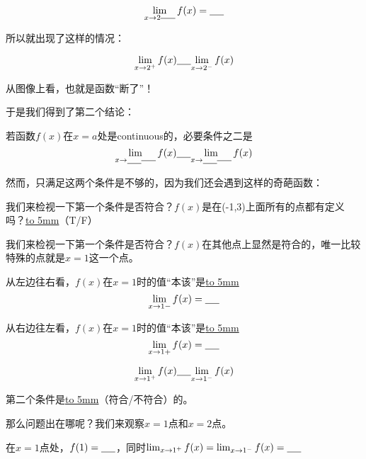 \documentclass[UTF8]{ctexart}
\begin{document}
\[{\lim_{x \to 2^{\underline{\hbox to 5mm{}}}} f(x)} = \underline{\hbox to 5mm{}}\]

所以就出现了这样的情况：

\[{\lim_{x \to 2^+} f(x)} \underline{\hbox to 5mm{}} {\lim_{x \to 2^-} f(x)} \]

从图像上看，也就是函数“断了”！

于是我们得到了第二个结论：

若函数$f(x)$在$x=a$处是continuous的，必要条件之二是\[{\lim_{x \to \underline{\hbox to 5mm{}}^{\underline{\hbox to 5mm{}}}} f(x)}   \underline{\hbox to 5mm{}}    {\lim_{x \to \underline{\hbox to 5mm{}}^{\underline{\hbox to 5mm{}}}} f(x)}\]

然而，只满足这两个条件是不够的，因为我们还会遇到这样的奇葩函数：

\begin{center}
\end{center}

我们来检视一下第一个条件是否符合？$f(x)$是在(-1,3)上面所有的点都有定义吗？\underline{\hbox to 5mm{}}（T/F）

我们来检视一下第一个条件是否符合？$f(x)$在其他点上显然是符合的，唯一比较特殊的点就是$x=1$这一个点。

从左边往右看，$f(x)$在$x=1$时的值“本该”是\underline{\hbox to 5mm{}}
\[{\lim_{x \to 1-} f(x)} = \underline{\hbox to 5mm{}}\]

从右边往左看，$f(x)$在$x=1$时的值“本该”是\underline{\hbox to 5mm{}}
\[{\lim_{x \to 1+} f(x)} = \underline{\hbox to 5mm{}}\]

\[{\lim_{x \to 1^+} f(x)} \underline{\hbox to 5mm{}} {\lim_{x \to 1^-} f(x)} \]

第二个条件是\underline{\hbox to 5mm{}}（符合/不符合）的。

那么问题出在哪呢？我们来观察$x=1$点和$x = 2$点。

在$x = 1$点处，$f(1) = \underline{\hbox to 5mm{}}$，同时${\lim_{x \to 1^+} f(x)} = {\lim_{x \to 1^-} f(x)} = \underline{\hbox to 5mm{}}$
\end{document}
